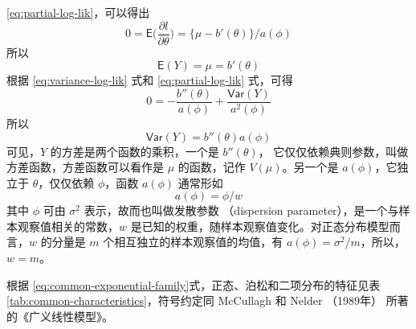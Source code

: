 \documentclass[12pt,a4paper,UTF8,twoside]{book}
\theoremstyle{definition}
\theoremstyle{definition}
\theoremstyle{definition}
\theoremstyle{remark}
\begin{document}
\eqref{eq:partial-log-lik}，可以得出 \[ 
0 = \mathsf{E}\big( \frac{\partial l}{\partial \theta} \big) = \big\{ \mu - b'(\theta) \big\}/a(\phi)
\] \noindent 所以 \[ \mathsf{E}(Y) = \mu = b'(\theta) \] \noindent 根据
\eqref{eq:variance-log-lik} 式和 \eqref{eq:partial-log-lik} 式，可得
\[ 0 = - \frac{b''(\theta)}{a(\phi)} + \frac{\mathsf{Var}(Y)}{a^2(\phi)} \]
\noindent 所以 \[ \mathsf{Var}(Y) = b''(\theta)a(\phi) \] 可见，\(Y\)
的方差是两个函数的乘积，一个是 \(b''(\theta)\)，
它仅仅依赖典则参数，叫做方差函数，方差函数可以看作是 \(\mu\)
的函数，记作 \(V(\mu)\)。另一个是 \(a(\phi)\)，它独立于
\(\theta\)，仅仅依赖 \(\phi\)，函数 \(a(\phi)\) 通常形如
\[ a(\phi) = \phi/w \] \noindent 其中 \(\phi\) 可由 \(\sigma^2\)
表示，故而也叫做发散参数 （dispersion
parameter），是一个与样本观察值相关的常数，\(w\)
是已知的权重，随样本观察值变化。对正态分布模型而言，\(w\) 的分量是 \(m\)
个相互独立的样本观察值的均值，有
\(a(\phi) = \sigma^2/m\)，所以，\(w = m\)。

根据
\eqref{eq:common-exponential-family}式，正态、泊松和二项分布的特征见表
\ref{tab:common-characteristics}，符号约定同 McCullagh 和 Nelder
（1989年） 所著的《广义线性模型》。
\end{document}
